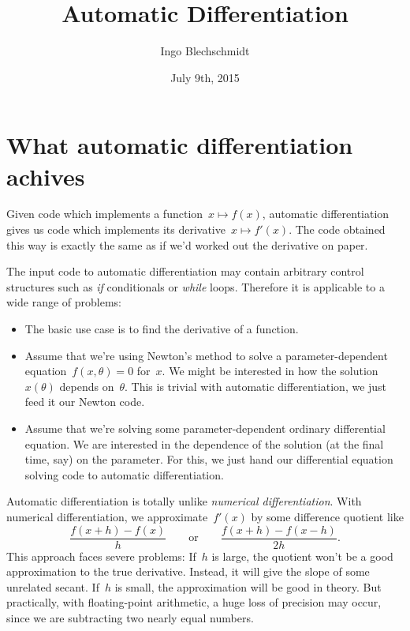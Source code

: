 \documentclass[a4paper,ngerman,12pt]{scrartcl}
\theoremstyle{definition}
\theoremstyle{plain}
\theoremstyle{remark}
\begin{document}
\title{Automatic Differentiation}
\author{Ingo Blechschmidt}
\date{July 9th, 2015}
\maketitle

\section{What automatic differentiation achives}

Given code which implements a function~$x \mapsto f(x)$, automatic
differentiation gives us code which implements its derivative~$x \mapsto
f'(x)$. The code obtained this way is exactly the same as if we'd worked out
the derivative on paper.

The input code to automatic differentiation may contain arbitrary control
structures such as \emph{if} conditionals or \emph{while} loops. Therefore it
is applicable to a wide range of problems:

\begin{itemize}
\item The basic use case is to find the derivative of a function.
\item Assume that we're using Newton's method to solve a parameter-dependent
equation~$f(x,\theta) = 0$ for~$x$. We might be interested in how the
solution~$x(\theta)$ depends on~$\theta$. This is trivial with automatic
differentiation, we just feed it our Newton code.
\item Assume that we're solving some parameter-dependent ordinary differential
equation. We are interested in the dependence of the solution (at the final
time, say) on the parameter. For this, we just hand our differential equation
solving code to automatic differentiation.
\end{itemize}

Automatic differentiation is totally unlike \emph{numerical
differentiation}. With numerical differentiation, we approximate~$f'(x)$ by
some difference quotient like
\[ \frac{f(x + h) - f(x)}{h} \qquad\text{or}\qquad
  \frac{f(x + h) - f(x - h)}{2h}. \]
This approach faces severe problems: If~$h$ is large, the quotient won't be a
good approximation to the true derivative. Instead, it will give the slope of
some unrelated secant. If~$h$ is small, the approximation will be good in
theory. But practically, with floating-point arithmetic, a huge loss of
precision may occur, since we are subtracting two nearly equal numbers.
\end{document}
